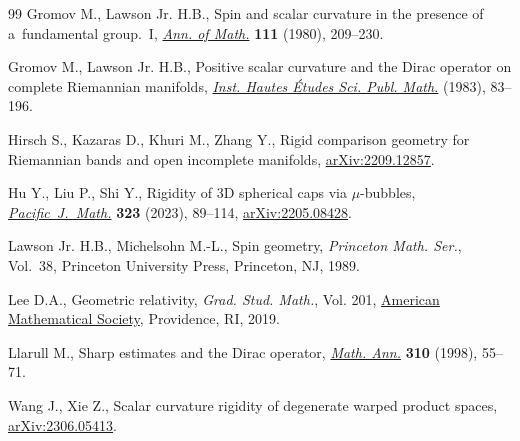 \documentclass[pdftex]{sigma}
\numberwithin{equation}{section}
\begin{document}
\begin{thebibliography}{99}
Gromov M., Lawson Jr. H.B., Spin and scalar curvature in the presence of a~fundamental group.~{I}, \href{https://doi.org/10.2307/1971198}{\textit{Ann. of Math.}} \textbf{111} (1980), 209--230.

Gromov M., Lawson Jr. H.B., Positive scalar curvature and the {D}irac operator
 on complete {R}iemannian manifolds, \href{https://doi.org/10.1007/BF02953774}{\textit{Inst. Hautes \'Etudes Sci. Publ.
 Math.}} (1983), 83--196.

Hirsch S., Kazaras D., Khuri M., Zhang Y., Rigid comparison geometry for
 {R}iemannian bands and open incomplete manifolds, \href{https://arxiv.org/abs/2209.12857}{arXiv:2209.12857}.

Hu Y., Liu P., Shi Y., Rigidity of 3{D} spherical caps via {$\mu$}-bubbles,
 \href{https://doi.org/10.2140/pjm.2023.323.89}{\textit{Pacific~J.~Math.}} \textbf{323} (2023), 89--114, \href{https://arxiv.org/abs/2205.08428}{arXiv:2205.08428}.

Lawson Jr. H.B., Michelsohn M.-L., Spin geometry, \textit{Princeton Math. Ser.},
 Vol.~38, Princeton University Press, Princeton, NJ, 1989.

Lee D.A., Geometric relativity, \textit{Grad. Stud. Math.}, Vol. 201, \href{https://doi.org/10.1090/gsm/201}{American
 Mathematical Society}, Providence, RI, 2019.

Llarull M., Sharp estimates and the {D}irac operator, \href{https://doi.org/10.1007/s002080050136}{\textit{Math. Ann.}}
 \textbf{310} (1998), 55--71.

Wang J., Xie Z., Scalar curvature rigidity of degenerate warped product spaces,
 \href{https://arxiv.org/abs/2306.05413}{arXiv:2306.05413}.

\end{thebibliography}\LastPageEnding
\end{document}
